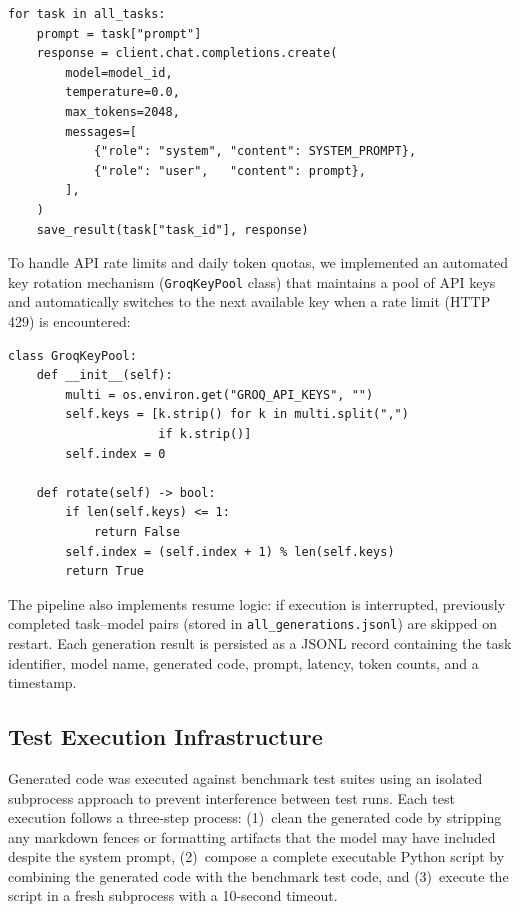 \documentclass[smallextended]{svjour3}
\begin{document}
\begin{lstlisting}[caption={Simplified code generation pipeline showing the main generation loop and result persistence.},label=lst:generation]
for task in all_tasks:
    prompt = task["prompt"]
    response = client.chat.completions.create(
        model=model_id,
        temperature=0.0,
        max_tokens=2048,
        messages=[
            {"role": "system", "content": SYSTEM_PROMPT},
            {"role": "user",   "content": prompt},
        ],
    )
    save_result(task["task_id"], response)
\end{lstlisting}

To handle API rate limits and daily token quotas, we implemented an automated key rotation mechanism (\texttt{GroqKeyPool} class) that maintains a pool of API keys and automatically switches to the next available key when a rate limit (HTTP 429) is encountered:

\begin{lstlisting}[caption={API key rotation mechanism for handling Groq rate limits. Multiple keys are loaded from a comma-separated environment variable.},label=lst:keypool]
class GroqKeyPool:
    def __init__(self):
        multi = os.environ.get("GROQ_API_KEYS", "")
        self.keys = [k.strip() for k in multi.split(",")
                     if k.strip()]
        self.index = 0

    def rotate(self) -> bool:
        if len(self.keys) <= 1:
            return False
        self.index = (self.index + 1) % len(self.keys)
        return True
\end{lstlisting}

The pipeline also implements resume logic: if execution is interrupted, previously completed task--model pairs (stored in \texttt{all\_generations.jsonl}) are skipped on restart. Each generation result is persisted as a JSONL record containing the task identifier, model name, generated code, prompt, latency, token counts, and a timestamp.

\subsection{Test Execution Infrastructure}
\label{sec:testing}

Generated code was executed against benchmark test suites using an isolated subprocess approach to prevent interference between test runs. Each test execution follows a three-step process: (1)~clean the generated code by stripping any markdown fences or formatting artifacts that the model may have included despite the system prompt, (2)~compose a complete executable Python script by combining the generated code with the benchmark test code, and (3)~execute the script in a fresh subprocess with a 10-second timeout.
\end{document}
